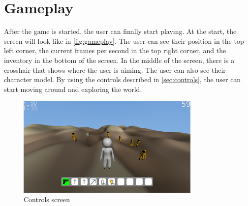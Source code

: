 \section{Gameplay}\label{sec:gameplay}
After the game is started, the user can finally start playing.
At the start, the screen will look like in \autoref{fig:gameplay}.
The user can see their position in the top left corner, the current frames per second in the top right corner, and the inventory in the bottom of the screen.
In the middle of the screen, there is a crosshair that shows where the user is aiming.
The user can also see their character model.
By using the controls described in \autoref{sec:controls}, the user can start moving around and exploring the world.


\begin{figure}[!htb]
    \centering
    \includegraphics[width=0.8\textwidth]{chapters/user_manual/resources/gameplay.png}
    \caption{Controls screen}
    \label{fig:gameplay}
\end{figure}